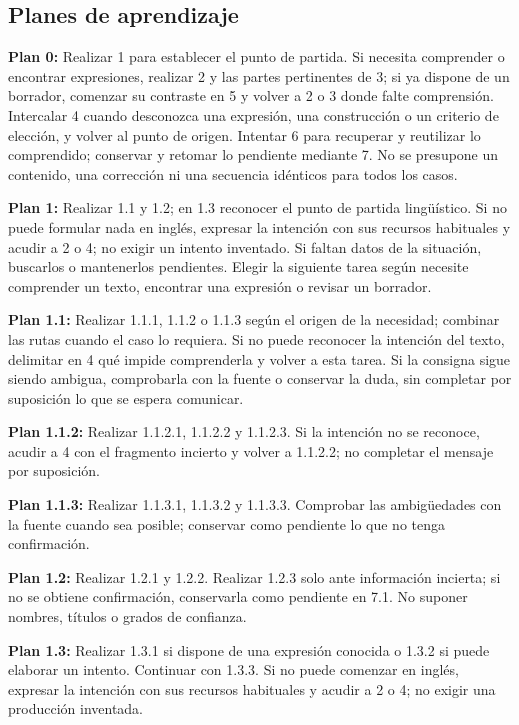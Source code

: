 \documentclass[10pt,a4paper]{article}
\begin{document}
\subsection*{Planes de aprendizaje}
\textbf{Plan 0:} Realizar 1 para establecer el punto de partida. Si necesita comprender o encontrar expresiones, realizar 2 y las partes pertinentes de 3; si ya dispone de un borrador, comenzar su contraste en 5 y volver a 2 o 3 donde falte comprensión. Intercalar 4 cuando desconozca una expresión, una construcción o un criterio de elección, y volver al punto de origen. Intentar 6 para recuperar y reutilizar lo comprendido; conservar y retomar lo pendiente mediante 7. No se presupone un contenido, una corrección ni una secuencia idénticos para todos los casos.\par
\textbf{Plan 1:} Realizar 1.1 y 1.2; en 1.3 reconocer el punto de partida lingüístico. Si no puede formular nada en inglés, expresar la intención con sus recursos habituales y acudir a 2 o 4; no exigir un intento inventado. Si faltan datos de la situación, buscarlos o mantenerlos pendientes. Elegir la siguiente tarea según necesite comprender un texto, encontrar una expresión o revisar un borrador.\par
\textbf{Plan 1.1:} Realizar 1.1.1, 1.1.2 o 1.1.3 según el origen de la necesidad; combinar las rutas cuando el caso lo requiera. Si no puede reconocer la intención del texto, delimitar en 4 qué impide comprenderla y volver a esta tarea. Si la consigna sigue siendo ambigua, comprobarla con la fuente o conservar la duda, sin completar por suposición lo que se espera comunicar.\par
\textbf{Plan 1.1.2:} Realizar 1.1.2.1, 1.1.2.2 y 1.1.2.3. Si la intención no se reconoce, acudir a 4 con el fragmento incierto y volver a 1.1.2.2; no completar el mensaje por suposición.\par
\textbf{Plan 1.1.3:} Realizar 1.1.3.1, 1.1.3.2 y 1.1.3.3. Comprobar las ambigüedades con la fuente cuando sea posible; conservar como pendiente lo que no tenga confirmación.\par
\textbf{Plan 1.2:} Realizar 1.2.1 y 1.2.2. Realizar 1.2.3 solo ante información incierta; si no se obtiene confirmación, conservarla como pendiente en 7.1. No suponer nombres, títulos o grados de confianza.\par
\textbf{Plan 1.3:} Realizar 1.3.1 si dispone de una expresión conocida o 1.3.2 si puede elaborar un intento. Continuar con 1.3.3. Si no puede comenzar en inglés, expresar la intención con sus recursos habituales y acudir a 2 o 4; no exigir una producción inventada.\par
\end{document}
